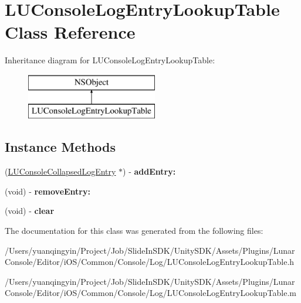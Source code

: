 \hypertarget{interface_l_u_console_log_entry_lookup_table}{}\section{L\+U\+Console\+Log\+Entry\+Lookup\+Table Class Reference}
\label{interface_l_u_console_log_entry_lookup_table}
Inheritance diagram for L\+U\+Console\+Log\+Entry\+Lookup\+Table\+:\begin{figure}[H]
\begin{center}
\leavevmode
\includegraphics[height=2.000000cm]{interface_l_u_console_log_entry_lookup_table}
\end{center}
\end{figure}
\subsection*{Instance Methods}
\begin{DoxyCompactItemize}
\item 
\mbox{\label{interface_l_u_console_log_entry_lookup_table_a41c14999af2c5a3dbfbbd6a05333db56}} 
(\mbox{\hyperlink{interface_l_u_console_collapsed_log_entry}{L\+U\+Console\+Collapsed\+Log\+Entry}} $\ast$) -\/ {\bfseries add\+Entry\+:}
\item 
\mbox{\label{interface_l_u_console_log_entry_lookup_table_aa629ebcb1b6387347646d06c8deb0cfe}} 
(void) -\/ {\bfseries remove\+Entry\+:}
\item 
\mbox{\label{interface_l_u_console_log_entry_lookup_table_ae9355f01386ebaaa5690e6f1333a9509}} 
(void) -\/ {\bfseries clear}
\end{DoxyCompactItemize}


The documentation for this class was generated from the following files\+:\begin{DoxyCompactItemize}
\item 
/\+Users/yuanqingyin/\+Project/\+Job/\+Slide\+In\+S\+D\+K/\+Unity\+S\+D\+K/\+Assets/\+Plugins/\+Lunar\+Console/\+Editor/i\+O\+S/\+Common/\+Console/\+Log/L\+U\+Console\+Log\+Entry\+Lookup\+Table.\+h\item 
/\+Users/yuanqingyin/\+Project/\+Job/\+Slide\+In\+S\+D\+K/\+Unity\+S\+D\+K/\+Assets/\+Plugins/\+Lunar\+Console/\+Editor/i\+O\+S/\+Common/\+Console/\+Log/L\+U\+Console\+Log\+Entry\+Lookup\+Table.\+m\end{DoxyCompactItemize}
